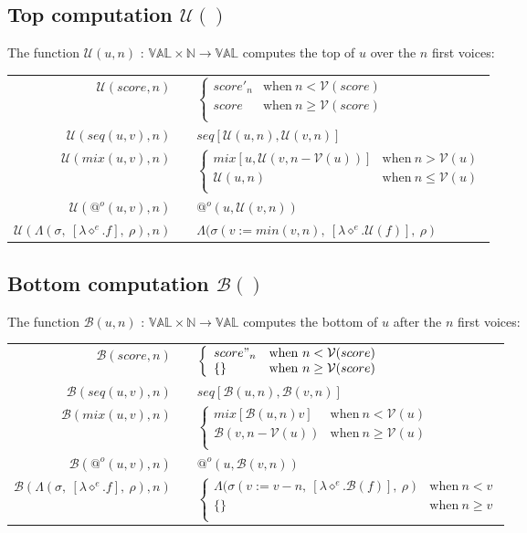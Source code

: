 \documentclass[10pt,a4paper,frenchb]{article}
\makeatletter
\newcommand{\var}[1]	{\ensuremath{\diamond^#1}}
\newcommand{\es}		{\{\}}
\newcommand{\val}		{\ensuremath{\mathbb{VAL}}}
\newcommand{\closure}	{\ensuremath{\Lambda}}
\newcommand{\applyop}	{\ensuremath{@}}
\newcommand{\noredex}	{\ensuremath{\applyop^o}}
\newcommand{\sdomain}[3]{$#1 \times #2 \rightarrow #3$}
\newcommand{\envsym}			{\ensuremath{\rho}}
\newcommand{\closenv}[2][f]		{\closure(#2,\ [\lambda \var{e}.#1],\ \envsym)}
\newcommand{\apexpr}[1] 	{#1(u, v)}
\newcommand{\voices}		{\ensuremath{\mathcal V}}
\renewcommand{\top}		{\ensuremath{\mathcal U}}
\newcommand{\bottom}		{\ensuremath{\mathcal B}}
\newcommand{\bounds}		{\ensuremath{\sigma}}
\newcommand{\evaltable}[1][$\rightarrow$]	  {\begin{center} \begin{tabular*}{0.9\linewidth}{rc@{ #1 }l}}
\newcommand{\evaltablend}  		{\end{tabular*}\end{center}}
\newcommand{\evalspace}	  		{\vspace{2mm}\\}
\makeatother
\begin{document}
\subsection{Top computation $\top()$}
The function $\top(u,n)$ :  \sdomain{\val}{\mathbb{N}}{\val} computes the top of $u$ over the $n$ first voices:

\evaltable
 \hline
 $\top(score,n)$				& & $\left\{ \begin{array}{ll}
 								score'_{n} & \mathrm{when} \  n < \voices(score) \\
								score & \mathrm{when} \  n \geq \voices(score) \\
	 							\end{array} \right.$ \evalspace
 $\top(\apexpr{seq},n)$		& & $seq[\top(u, n),\top(v, n)]$ \evalspace
 $\top(\apexpr{mix},n)$ 			& & $\left\{ \begin{array}{ll}
 								mix[u,\top(v,n-\voices(u))] & \mathrm{when} \  n > \voices(u) \\
								\top(u,n) & \mathrm{when} \  n \leq\voices(u) \\
	 							\end{array} \right.$ \evalspace
 $\top(\noredex (u,v),n)$ 	& & $\noredex(u, \top(v,n))$ \\
 $\top(\closenv{\bounds},n)$ 	& &  $\closenv[\top(f)]{\bounds(v:=min(v,n)}$ \\
 \hline
\evaltablend

\subsection{Bottom computation $\bottom()$}
The function $\bottom(u,n)$ :  \sdomain{\val}{\mathbb{N}}{\val} computes the bottom of $u$ after the $n$ first voices:

\evaltable
 \hline
 $\bottom(score,n)$				& & $\left\{ \begin{array}{ll}
 								score"_{n} & \mathrm{when} \  n < \voices(score) \\
								\es & \mathrm{when} \  n \geq \voices(score) \\
	 							\end{array} \right.$ \evalspace
 $\bottom(\apexpr{seq},n)$		& & $seq[\bottom(u, n), \bottom(v, n)]$ \evalspace
 $\bottom(\apexpr{mix},n)$ 			& & $\left\{ \begin{array}{ll}
 								mix[\bottom(u,n) v] & \mathrm{when} \  n < \voices(u) \\
								\bottom(v,n - \voices(u)) & \mathrm{when} \  n \geq\voices(u) \\
	 							\end{array} \right.$ \evalspace
 $\bottom(\noredex (u,v),n)$ 	& & $\noredex(u, \bottom(v,n))$ \evalspace
 $\bottom(\closenv{\bounds},n)$ 	& &   $\left\{ \begin{array}{ll}
 								\closenv[\bottom(f)]{\bounds(v:=v-n} & \mathrm{when} \  n < v \\
								\es & \mathrm{when} \  n \geq v \\
	 							\end{array} \right.$ \\
 \hline
\evaltablend
\end{document}
